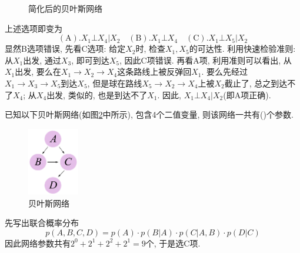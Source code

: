 \documentclass{article}
\begin{document}
\begin{homeworkProblem}
\begin{figure}[H]
		\caption{简化后的贝叶斯网络}
		\label{fig:简化后的贝叶斯网络}
	\end{figure}
	上述选项即变为
	$$
	\left( \text{A} \right) . X_1\bot X_4|X_2\quad \left( \text{B} \right) . X_1\bot X_4\quad \left( \text{C} \right) . X_1\bot X_5|X_2
	$$
	显然B选项错误, 先看C选项: 给定$X_2$时, 检查$X_1,X_5$的可达性. 利用快速检验准则: 从$X_1$出发, 通过$X_3$, 即可到达$X_5$, 因此C项错误. 再看A项, 利用准则可以看出, 从$X_1$出发, 要么在$X_1\to X_2\to X_4$这条路线上被反弹回$X_1$. 要么先经过$X_1\to X_3\to X_5$到达$X_5$, 但是球在路线$X_5\to X_2\to X_4$上被$X_2$截止了, 总之到达不了$X_4$; 从$X_4$出发, 类似的, 也是到达不了$X_1$. 因此, $X_1\bot X_4|X_2$(即A项正确).
\end{homeworkProblem}

\pagebreak

\begin{homeworkProblem}
	已知以下贝叶斯网络(如图\ref{fig:贝叶斯网络2}中所示), 包含4个二值变量, 则该网络一共有(\quad)个参数.

	\begin{figure}[H]  %
		\centering
		\includegraphics[width=0.2\textwidth]{images/title/贝叶斯网络2.pdf}
		\caption{贝叶斯网络}
		\label{fig:贝叶斯网络2}
	\end{figure}
	\solution 先写出联合概率分布$$p\left( A,B,C,D \right) =p\left( A \right) \cdot p\left( B|A \right) \cdot p\left( C|A,B \right) \cdot p\left( D|C \right) 
	$$
	因此网络参数共有$2^0+2^1+2^2+2^1=9$个, 于是选C项.
\end{homeworkProblem}
\end{document}
